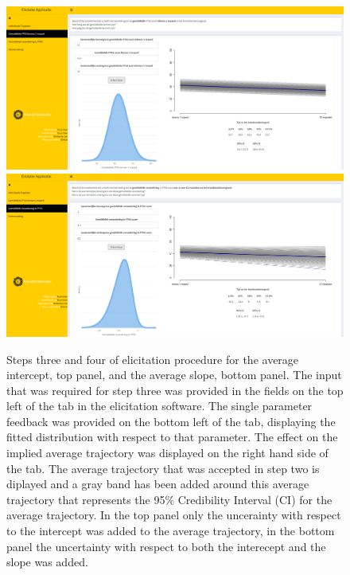 \documentclass[openright,titlepage,12pt,a4paper]{book}
\begin{document}
\begin{figure}[H]

{\centering \includegraphics[width=0.9\linewidth]{figures/chapter_6/Figure4a} \includegraphics[width=0.9\linewidth]{figures/chapter_6/Figure4b} 

}

\caption{Steps three and four of elicitation procedure for the average intercept, top panel, and the average slope, bottom panel. The input that was required for step three was provided in the fields on the top left of the tab in the elicitation software. The single parameter feedback was provided on the bottom left of the tab, displaying the fitted distribution with respect to that parameter. The effect on the implied average trajectory was displayed on the right hand side of the tab. The average trajectory that was accepted in step two is diplayed and a gray band has been added around this average trajectory that represents the 95\% Credibility Interval (CI) for the average trajectory. In the top panel only the uncerainty with respect to the intercept was added to the average trajectory, in the bottom panel the uncertainty with respect to both the interecept and the slope was added.}\label{fig:ch06fig4}
\end{figure}
\end{document}

